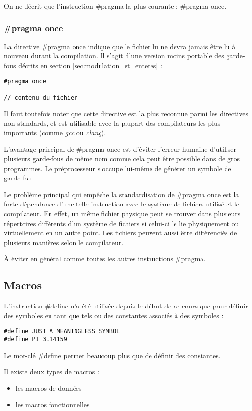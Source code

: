 \documentclass[../../../main.tex]{subfiles}
\begin{document}
On ne décrit que l'instruction \textsf{\#pragma} la plus courante : \textsf{\#pragma once}.
\subsubsection{\#pragma once}
La directive \textsf{\#pragma once} indique que le fichier lu ne devra jamais être lu à nouveau durant la compilation. Il s'agit d'une version moins portable des garde-fous décrits en section \ref{sec:modulation_et_entetes} :
\begin{verbatim}
#pragma once

// contenu du fichier
\end{verbatim}
Il faut toutefois noter que cette directive est la plus reconnue parmi les directives non standards, et est utilisable avec la plupart des compilateurs les plus importants (comme \textit{gcc} ou \textit{clang}).

L'avantage principal de \textsf{\#pragma once} est d'éviter l'erreur humaine d'utiliser plusieurs garde-fous de même nom comme cela peut être possible dans de gros programmes. Le préprocesseur s'occupe lui-même de générer un symbole de garde-fou.

Le problème principal qui empêche la standardisation de \textsf{\#pragma once} est la forte dépendance d'une telle instruction avec le système de fichiers utilisé et le compilateur. En effet, un même fichier physique peut se trouver dans plusieurs répertoires différents d'un système de fichiers si celui-ci le lie physiquement ou virtuellement en un autre point. Les fichiers peuvent aussi être différenciés de plusieurs manières selon le compilateur.

À éviter en général comme toutes les autres instructions \textsf{\#pragma}.
\subsection{Macros} \label{sub:macros}
L'instruction \textsf{\#define} n'a été utilisée depuis le début de ce cours que pour définir des symboles en tant que tels ou des constantes associés à des symboles :
\begin{verbatim}
#define JUST_A_MEANINGLESS_SYMBOL
#define PI 3.14159
\end{verbatim}
Le mot-clé \textsf{\#define} permet beaucoup plus que de définir des constantes.

Il existe deux types de macros :
\begin{itemize}
	\item les macros de données
	\item les macros fonctionnelles
\end{itemize}
\end{document}
